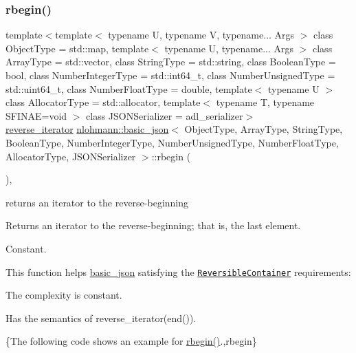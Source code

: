 \subsubsection{\texorpdfstring{rbegin()}{rbegin()}\hspace{0.1cm}{\footnotesize\ttfamily [1/2]}}
{\footnotesize\ttfamily template$<$template$<$ typename U, typename V, typename... Args $>$ class Object\+Type = std\+::map, template$<$ typename U, typename... Args $>$ class Array\+Type = std\+::vector, class String\+Type  = std\+::string, class Boolean\+Type  = bool, class Number\+Integer\+Type  = std\+::int64\+\_\+t, class Number\+Unsigned\+Type  = std\+::uint64\+\_\+t, class Number\+Float\+Type  = double, template$<$ typename U $>$ class Allocator\+Type = std\+::allocator, template$<$ typename T, typename S\+F\+I\+N\+A\+E=void $>$ class J\+S\+O\+N\+Serializer = adl\+\_\+serializer$>$ \\
\mbox{\hyperlink{classnlohmann_1_1basic__json_ac223d5560c2b05a208c88de67376c5f2}{reverse\+\_\+iterator}} \mbox{\hyperlink{classnlohmann_1_1basic__json}{nlohmann\+::basic\+\_\+json}}$<$ Object\+Type, Array\+Type, String\+Type, Boolean\+Type, Number\+Integer\+Type, Number\+Unsigned\+Type, Number\+Float\+Type, Allocator\+Type, J\+S\+O\+N\+Serializer $>$\+::rbegin (\begin{DoxyParamCaption}{ }\end{DoxyParamCaption})\hspace{0.3cm}{\ttfamily [inline]}, {\ttfamily [noexcept]}}



returns an iterator to the reverse-\/beginning 

Returns an iterator to the reverse-\/beginning; that is, the last element.

  Constant.

This function helps {\ttfamily \mbox{\hyperlink{classnlohmann_1_1basic__json}{basic\+\_\+json}}} satisfying the \href{http://en.cppreference.com/w/cpp/concept/ReversibleContainer}{\tt Reversible\+Container} requirements\+:
\begin{DoxyItemize}
\item The complexity is constant.
\item Has the semantics of {\ttfamily reverse\+\_\+iterator(end())}.
\end{DoxyItemize}

\{The following code shows an example for {\ttfamily \mbox{\hyperlink{classnlohmann_1_1basic__json_a1ef93e2006dbe52667294f5ef38b0b10}{rbegin()}}}.,rbegin\}

